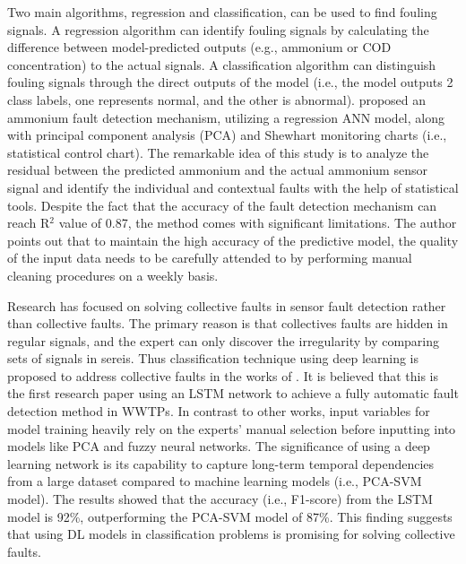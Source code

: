 Two main algorithms, regression and classification, can be used to find fouling signals. A regression algorithm can identify fouling signals by calculating the difference between model-predicted outputs (e.g., ammonium or COD concentration) to the actual signals. A classification algorithm can distinguish fouling signals through the direct outputs of the model (i.e., the model outputs 2 class labels, one represents normal, and the other is abnormal). \citet{cecconiSoftSensingOnLine2021} proposed an ammonium fault detection mechanism, utilizing a regression ANN model, along with principal component analysis (PCA) and Shewhart monitoring charts (i.e., statistical control chart). The remarkable idea of this study is to analyze the residual between the predicted ammonium and the actual ammonium sensor signal and identify the individual and contextual faults with the help of statistical tools. Despite the fact that the accuracy of the fault detection mechanism can reach R$^2$ value of 0.87, the method comes with significant limitations. The author points out that to maintain the high accuracy of the predictive model, the quality of the input data needs to be carefully attended to by performing manual cleaning procedures on a weekly basis. 

Research has focused on solving collective faults in sensor fault detection rather than collective faults. The primary reason is that collectives faults are hidden in regular signals, and the expert can only discover the irregularity by comparing sets of signals in sereis. Thus classification technique using deep learning is proposed to address collective faults in the works of \citet{mamandipoorMonitoringDetectingFaults2020}. It is believed that this is the first research paper using an LSTM network to achieve a fully automatic fault detection method in WWTPs. In contrast to other works, input variables for model training heavily rely on the experts' manual selection before inputting into models like PCA and fuzzy neural networks. The significance of using a deep learning network is its capability to capture long-term temporal dependencies from a large dataset compared to machine learning models (i.e., PCA-SVM model). The results showed that the accuracy (i.e., F1-score) from the LSTM model is 92\%, outperforming the PCA-SVM model of 87\%. This finding suggests that using DL models in classification problems is promising for solving collective faults.

